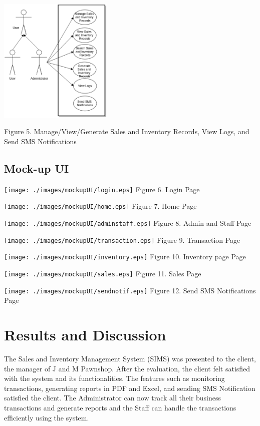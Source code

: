 \documentclass[journal]{./IEEE/IEEEtran}
\begin{document}
\begin{center}
\includegraphics[height=60mm]{./images/useCase/salesinventory.eps}

Figure 5. Manage/View/Generate Sales and Inventory Records, View Logs, and Send SMS Notifications

\end{center}

\subsection{Mock-up UI}
\begin{center}

\texttt{[image: ./images/mockupUI/login.eps]}
Figure 6. Login Page


\texttt{[image: ./images/mockupUI/home.eps]}
Figure 7. Home Page


\texttt{[image: ./images/mockupUI/adminstaff.eps]}
Figure 8. Admin and Staff Page


\texttt{[image: ./images/mockupUI/transaction.eps]}
Figure 9. Transaction Page


\texttt{[image: ./images/mockupUI/inventory.eps]}
Figure 10. Inventory page Page


\texttt{[image: ./images/mockupUI/sales.eps]}
Figure 11. Sales Page


\texttt{[image: ./images/mockupUI/sendnotif.eps]}
Figure 12. Send SMS Notifications Page

\end{center}

\section{Results and Discussion}
The Sales and Inventory Management System (SIMS) was presented to the client, the manager of J and M Pawnshop. After the evaluation, the client felt satisfied with the system and its functionalities. The features such as monitoring transactions, generating reports in PDF and Excel, and sending SMS Notification satisfied the client. The Administrator can now track all their business transactions and generate reports and the Staff can handle the transactions efficiently using the system.
\end{document}
